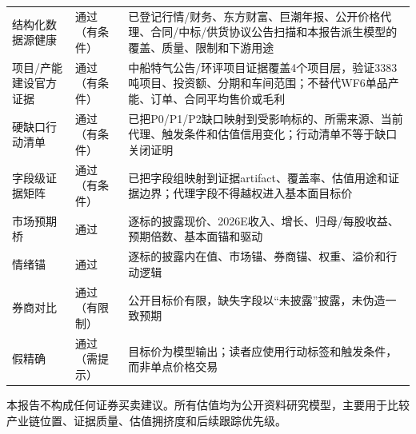 \begin{exhibitbox}[估值审计摘要]
{\begin{tabular}{lll}
结构化数据源健康 & 通过（有条件） & 已登记行情/财务、东方财富、巨潮年报、公开价格代理、合同/中标/供货协议公告扫描和本报告派生模型的覆盖、质量、限制和下游用途 \\
项目/产能建设官方证据 & 通过（有条件） & 中船特气公告/环评项目证据覆盖4个项目层，验证3383吨项目、投资额、分期和车间范围；不替代WF6单品产能、订单、合同平均售价或毛利 \\
硬缺口行动清单 & 通过（有条件） & 已把P0/P1/P2缺口映射到受影响标的、所需来源、当前代理、触发条件和估值信用变化；行动清单不等于缺口关闭证明 \\
字段级证据矩阵 & 通过（有条件） & 已把字段组映射到证据artifact、覆盖率、估值用途和证据边界；代理字段不得越权进入基本面目标价 \\
市场预期桥 & 通过 & 逐标的披露现价、2026E收入、增长、归母/每股收益、预期倍数、基本面锚和驱动 \\
情绪锚 & 通过 & 逐标的披露内在值、市场锚、券商锚、权重、溢价和行动逻辑 \\
券商对比 & 通过（有限制） & 公开目标价有限，缺失字段以“未披露”披露，未伪造一致预期 \\
假精确 & 通过（需提示） & 目标价为模型输出；读者应使用行动标签和触发条件，而非单点价格交易 \\
\bottomrule
\end{tabular}
}
\end{exhibitbox}

本报告不构成任何证券买卖建议。所有估值均为公开资料研究模型，主要用于比较产业链位置、证据质量、估值拥挤度和后续跟踪优先级。
